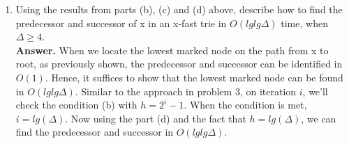 \documentclass[letterpaper,12pt]{article}
\begin{document}
\begin{enumerate}
\begin{enumerate}
		\item Using the results from parts (b), (c) and (d) above, describe how to find the predecessor and successor of x in an x-fast trie in $O(lg lg \Delta)$ time, when $\Delta \geq 4$.\\
		\textbf{Answer.} When we locate the lowest marked node on the path from x to root, as previously shown, the predecessor and successor can be identified in $O(1)$. Hence, it suffices to show that the lowest marked node can be found in $O(lg lg \Delta)$. Similar to the approach in problem 3, on iteration $i$, we'll check the condition (b) with $h=2^{i}-1$. When the condition is met, $i=lg(\Delta)$. Now using the part (d) and the fact that $h=lg(\Delta)$, we can find the predecessor and successor in $O(lg lg \Delta)$.
	\end{enumerate}



\end{enumerate}
\end{document}
